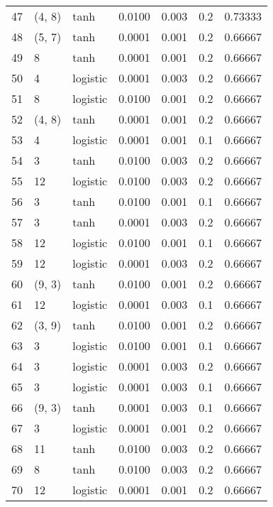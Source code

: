 \begin{tabular}{lllrrrr}
47  &      (4, 8) &      tanh &  0.0100 &  0.003 &  0.2 &   0.73333 \\
48  &      (5, 7) &      tanh &  0.0001 &  0.001 &  0.2 &   0.66667 \\
49  &           8 &      tanh &  0.0001 &  0.001 &  0.2 &   0.66667 \\
50  &           4 &  logistic &  0.0001 &  0.003 &  0.2 &   0.66667 \\
51  &           8 &  logistic &  0.0100 &  0.001 &  0.2 &   0.66667 \\
52  &      (4, 8) &      tanh &  0.0001 &  0.001 &  0.2 &   0.66667 \\
53  &           4 &  logistic &  0.0001 &  0.001 &  0.1 &   0.66667 \\
54  &           3 &      tanh &  0.0100 &  0.003 &  0.2 &   0.66667 \\
55  &          12 &  logistic &  0.0100 &  0.003 &  0.2 &   0.66667 \\
56  &           3 &      tanh &  0.0100 &  0.001 &  0.1 &   0.66667 \\
57  &           3 &      tanh &  0.0001 &  0.003 &  0.2 &   0.66667 \\
58  &          12 &  logistic &  0.0100 &  0.001 &  0.1 &   0.66667 \\
59  &          12 &  logistic &  0.0001 &  0.003 &  0.2 &   0.66667 \\
60  &      (9, 3) &      tanh &  0.0100 &  0.001 &  0.2 &   0.66667 \\
61  &          12 &  logistic &  0.0001 &  0.003 &  0.1 &   0.66667 \\
62  &      (3, 9) &      tanh &  0.0100 &  0.001 &  0.2 &   0.66667 \\
63  &           3 &  logistic &  0.0100 &  0.001 &  0.1 &   0.66667 \\
64  &           3 &  logistic &  0.0001 &  0.003 &  0.2 &   0.66667 \\
65  &           3 &  logistic &  0.0001 &  0.003 &  0.1 &   0.66667 \\
66  &      (9, 3) &      tanh &  0.0001 &  0.003 &  0.1 &   0.66667 \\
67  &           3 &  logistic &  0.0001 &  0.001 &  0.2 &   0.66667 \\
68  &          11 &      tanh &  0.0100 &  0.003 &  0.2 &   0.66667 \\
69  &           8 &      tanh &  0.0100 &  0.003 &  0.2 &   0.66667 \\
70  &          12 &  logistic &  0.0001 &  0.001 &  0.2 &   0.66667 \\

\end{tabular}
